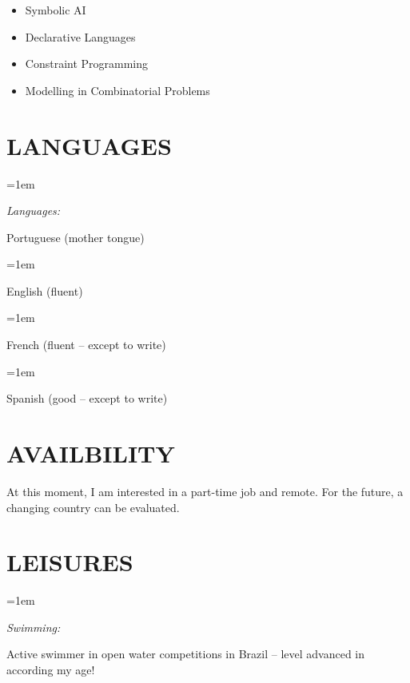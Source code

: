 \documentclass[paper=a4,fontsize=11pt]{scrartcl} %
\newlength{\spacebox}
\newcommand{\NewPart}[1]{\section*{\uppercase{#1}}}
\newcommand{\PersonalEntry}[2]{
		\noindent\hangindent=2em\hangafter=0 %
		\parbox{\spacebox}{        %
		\textit{#1}}		       %
		\hspace{1.5em} #2 \par}    %
\newcommand{\SkillsEntry}[2]{      %
		\noindent\hangindent=1em\hangafter=0 %
		\parbox{\spacebox}{        %
		\textit{#1}}			   %
		\hspace{1.2em} #2 \par}    %
\begin{document}
\begin{itemize}
\setlength\itemsep{-2mm}
\item Symbolic AI
\item Declarative Languages
\item Constraint Programming
\item Modelling in Combinatorial Problems

\end{itemize}

\NewPart{Languages}{}

\SkillsEntry{Languages:} {Portuguese (mother tongue)}
\SkillsEntry{}{English (fluent)}
\SkillsEntry{}{French (fluent -- except to write)}
\SkillsEntry{}{Spanish (good -- except to write)}


\NewPart{Availbility}{}

At this moment, I am interested in a part-time job and remote. For the future, a changing country can be evaluated.

\NewPart{Leisures}{}

\SkillsEntry{Swimming:}{Active swimmer in open water competitions in Brazil -- level advanced in according my age!}
\end{document}
